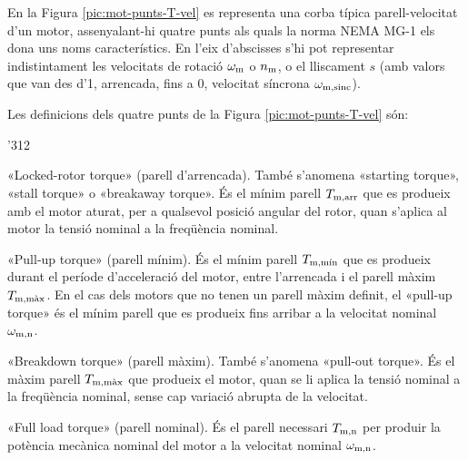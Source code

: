 En la Figura \vref{pic:mot-punts-T-vel} es representa una corba típica parell-velocitat d'un motor, assenyalant-hi quatre punts als quals la norma NEMA MG-1 els dona uns noms característics. En l'eix d'abscisses s'hi pot representar indistintament les velocitats de rotació $\omega_\mathrm{m}$ o $n_\mathrm{m}$, o  el lliscament $s$ (amb valors que van des d'1, arrencada, fins a 0, velocitat síncrona $\omega_\mathrm{m,sinc}$).

\begin{center}
	
	\label{pic:mot-punts-T-vel}
\end{center}

Les definicions dels quatre punts de la Figura  \vref{pic:mot-punts-T-vel} són:
\begin{dingautolist}{'312}
   \item «Locked-rotor torque» (parell d'arrencada). També s'anomena «starting torque», «stall torque» o «breakaway torque». És el mínim parell $T_\mathrm{m,arr}$ que es produeix amb el motor aturat, per a qualsevol posició angular del rotor, quan s'aplica al motor la tensió nominal a la freqüència nominal.
   \item «Pull-up torque» (parell mínim). És el mínim parell $T_\mathrm{m,\text{mín}}$ que es produeix durant el període d'acceleració del motor, entre l'arrencada  i el parell màxim $T_\mathrm{m,\text{màx}}$. En el cas dels motors que no tenen un parell màxim definit, el «pull-up torque» és el mínim parell que es produeix fins arribar a la velocitat nominal $\omega_\mathrm{m,n}$.
   \item «Breakdown torque» (parell màxim). També s'anomena «pull-out torque». És el màxim parell $T_\mathrm{m,\text{màx}}$ que  produeix  el motor, quan se li aplica  la tensió nominal a la freqüència nominal, sense cap variació abrupta de la velocitat.
   \item «Full load torque» (parell nominal). És el parell necessari $T_\mathrm{m,n}$ per produir la potència mecànica nominal del motor a la velocitat nominal  $\omega_\mathrm{m,n}$.
\end{dingautolist}

